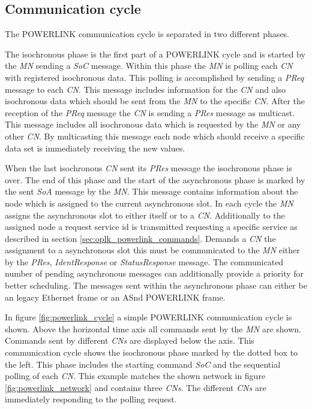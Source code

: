 \subsection{Communication cycle}
\label{sec:oplk_powerlink_commcycle}

The POWERLINK communication cycle is separated in two different phases.

The isochronous phase is the first part of a POWERLINK cycle and is started by the \emph{MN} sending a \emph{SoC} message.
Within this phase the \emph{MN} is polling each \emph{CN} with registered isochronous data.
This polling is accomplished by sending a \emph{PReq} message to each \emph{CN}.
This message includes information for the \emph{CN} and also isochronous data which should be sent from the \emph{MN} to the specific \emph{CN}.
After the reception of the \emph{PReq} message the \emph{CN} is sending a \emph{PRes} message as multicast.
This message includes all isochronous data which is requested by the \emph{MN} or any other \emph{CN}.
By multicasting this message each node which should receive a specific data set is immediately receiving the new values. \cite[section 4.2.4.1.1]{epsg_epsg_2013}

When the last isochronous \emph{CN} sent its \emph{PRes} message the isochronous phase is over.
The end of this phase and the start of the asynchronous phase is marked by the sent \emph{SoA} message by the \emph{MN}.
This message contains information about the node which is assigned to the current asynchronous slot.
In each cycle the \emph{MN} assigns the asynchronous slot to either itself or to a \emph{CN}.
Additionally to the assigned node a request service id is transmitted requesting a specific service as described in section \ref{sec:oplk_powerlink_commands}.
Demands a \emph{CN} the assignment to a asynchronous slot this must be communicated to the \emph{MN} either by the \emph{PRes}, \emph{IdentResponse} or \emph{StatusResponse} message.
The communicated number of pending asynchronous messages can additionally provide a priority for better scheduling.
The messages sent within the asynchronous phase can either be an legacy Ethernet frame or an ASnd POWERLINK frame. \cite[section 4.2.4.1.2]{epsg_epsg_2013}

In figure \ref{fig:powerlink_cycle} a simple POWERLINK communication cycle is shown.
Above the horizontal time axis all commands sent by the \emph{MN} are shown.
Commands sent by different \emph{CNs} are displayed below the axis.
This communication cycle shows the isochronous phase marked by the dotted box to the left.
This phase includes the starting command \emph{SoC} and the sequential polling of each \emph{CN}.
This example matches the shown network in figure \ref{fig:powerlink_network} and contains three \emph{CNs}.
The different \emph{CNs} are immediately responding to the polling request.

